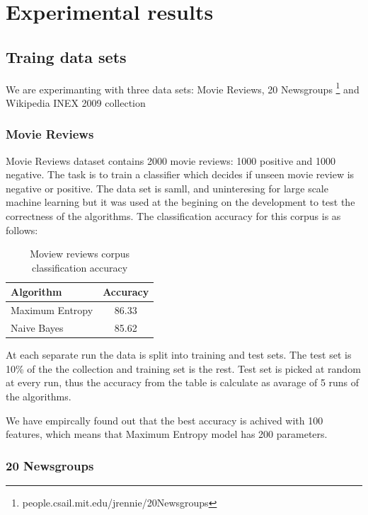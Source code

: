 \documentclass{report}
\begin{document}
\chapter{Experimental results}

\section{Traing data sets}

We are experimanting with three data sets: Movie Reviews\cite{Pang+Lee:04a}, 20 Newsgroups \footnote{people.csail.mit.edu/jrennie/20Newsgroups} and Wikipedia INEX 2009 collection \cite{conf/btw/SchenkelSK07}

\subsection{Movie Reviews}

Movie Reviews dataset contains 2000 movie reviews: 1000 positive and 1000 negative. The task is to train a classifier which decides if unseen movie review is negative or positive. The data set is samll, and uninteresing for large scale machine learning but it was used at the begining on the development to test the correctness of the algorithms. The classification accuracy for this corpus is as follows: 

\begin{table}[ht]
\centering
\begin{tabular}{ l c }
    \hline\hline
    Algorithm & Accuracy \\ [0.2ex]
    \hline
    Maximum Entropy &  86.33 \\ %
    Naive Bayes & 85.62 \\ %
    \hline
  \end{tabular}
\label{table:mrprecision}
\caption{Moview reviews corpus classification accuracy}
\end{table}

At each separate run the data is split into training and test sets. The test set is 10\% of the the collection and training set is the rest. Test set is picked at random at every run, thus the accuracy from the table is calculate as avarage of 5 runs of the algorithms.

We have empircally found out that the best accuracy is achived with 100 features, which means that Maximum Entropy model has 200 parameters.

\subsection{20 Newsgroups}
\end{document}
